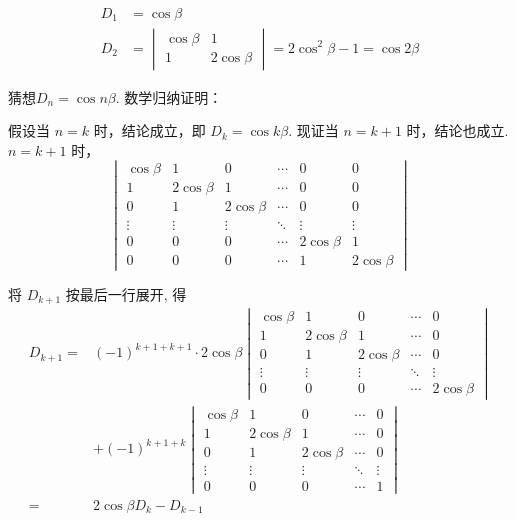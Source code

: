 \begin{solution}
    \begin{align*}
        D_1&=\cos\beta \\
        D_2&=\begin{vmatrix}
        \cos\beta&1\\
        1&2\cos\beta
        \end{vmatrix}=2\cos^2\beta-1=\cos2\beta
    \end{align*}

    猜想$D_n=\cos n\beta$. 数学归纳证明：

    假设当 $n=k$ 时，结论成立，即 $D_{k}=\cos k \beta$. 现证当 $n=k+1$ 时，结论也成立. $ n=k+1 $ 时，
    \[ \begin{vmatrix}
        \cos \beta & 1 & 0 & \cdots & 0 & 0 \\
        1 & 2 \cos \beta & 1 & \cdots & 0 & 0 \\
        0 & 1 & 2 \cos \beta & \cdots & 0 & 0 \\
        \vdots & \vdots & \vdots & \ddots & \vdots & \vdots \\
        0 & 0 & 0 & \cdots & 2 \cos \beta & 1 \\
        0 & 0 & 0 & \cdots & 1 & 2 \cos \beta
    \end{vmatrix} \]

    将 $D_{k+1}$ 按最后一行展开, 得
    \begin{align*}
        D_{k+1}=&(-1)^{k+1+k+1} \cdot 2 \cos \beta\begin{vmatrix}
            \cos \beta & 1 & 0 & \cdots & 0 \\
            1 & 2 \cos \beta & 1 & \cdots & 0 \\
            0 & 1 & 2 \cos \beta & \cdots & 0 \\
            \vdots & \vdots & \vdots & \ddots & \vdots \\
            0 & 0 & 0 & \cdots & 2 \cos \beta
        \end{vmatrix}\\
        &+(-1)^{k+1+k}
        \begin{vmatrix}
            \cos \beta & 1 & 0 & \cdots & 0 \\
            1 & 2 \cos \beta & 1 & \cdots & 0 \\
            0 & 1 & 2 \cos \beta & \cdots & 0 \\
            \vdots & \vdots & \vdots & \ddots & \vdots \\
            0 & 0 & 0 & \cdots & 1
        \end{vmatrix}\\
        =&2\cos\beta D_k-D_{k-1}
    \end{align*}


\end{solution}
